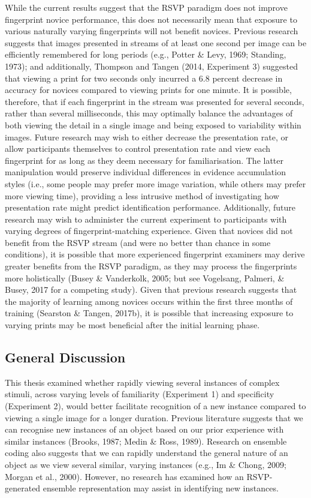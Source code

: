 \documentclass[
  english,
  man]{apa6}
\begin{document}
While the current results suggest that the RSVP paradigm does not improve fingerprint novice performance, this does not necessarily mean that exposure to various naturally varying fingerprints will not benefit novices. Previous research suggests that images presented in streams of at least one second per image can be efficiently remembered for long periods (e.g., Potter \& Levy, 1969; Standing, 1973); and additionally, Thompson and Tangen (2014, Experiment 3) suggested that viewing a print for two seconds only incurred a 6.8 percent decrease in accuracy for novices compared to viewing prints for one minute. It is possible, therefore, that if each fingerprint in the stream was presented for several seconds, rather than several milliseconds, this may optimally balance the advantages of both viewing the detail in a single image and being exposed to variability within images. Future research may wish to either decrease the presentation rate, or allow participants themselves to control presentation rate and view each fingerprint for as long as they deem necessary for familiarisation. The latter manipulation would preserve individual differences in evidence accumulation styles (i.e., some people may prefer more image variation, while others may prefer more viewing time), providing a less intrusive method of investigating how presentation rate might predict identification performance.
Additionally, future research may wish to administer the current experiment to participants with varying degrees of fingerprint-matching experience. Given that novices did not benefit from the RSVP stream (and were no better than chance in some conditions), it is possible that more experienced fingerprint examiners may derive greater benefits from the RSVP paradigm, as they may process the fingerprints more holistically (Busey \& Vanderkolk, 2005; but see Vogelsang, Palmeri, \& Busey, 2017 for a competing study). Given that previous research suggests that the majority of learning among novices occurs within the first three months of training (Searston \& Tangen, 2017b), it is possible that increasing exposure to varying prints may be most beneficial after the initial learning phase.

\hypertarget{general-discussion}{%
\subsection{General Discussion}\label{general-discussion}}

This thesis examined whether rapidly viewing several instances of complex stimuli, across varying levels of familiarity (Experiment 1) and specificity (Experiment 2), would better facilitate recognition of a new instance compared to viewing a single image for a longer duration. Previous literature suggests that we can recognise new instances of an object based on our prior experience with similar instances (Brooks, 1987; Medin \& Ross, 1989). Research on ensemble coding also suggests that we can rapidly understand the general nature of an object as we view several similar, varying instances (e.g., Im \& Chong, 2009; Morgan et al., 2000). However, no research has examined how an RSVP-generated ensemble representation may assist in identifying new instances.
\end{document}
